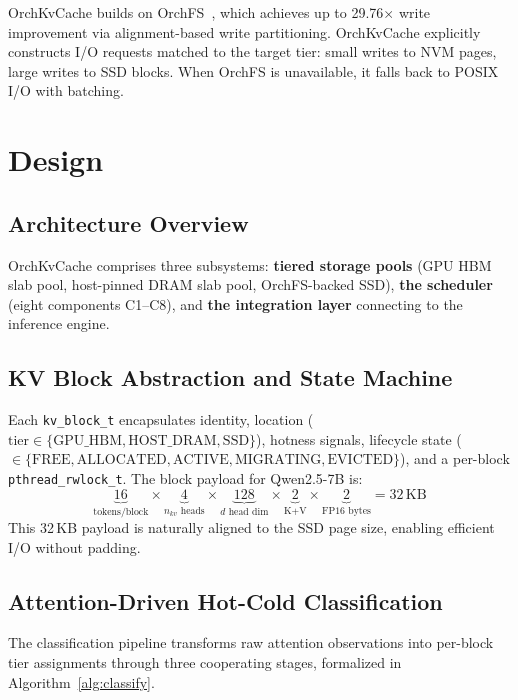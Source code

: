 \documentclass[conference]{IEEEtran}
\begin{document}
OrchKvCache builds on OrchFS~\cite{orchfs}, which achieves up to 29.76$\times$ write improvement via alignment-based write partitioning. OrchKvCache explicitly constructs I/O requests matched to the target tier: small writes to NVM pages, large writes to SSD blocks. When OrchFS is unavailable, it falls back to POSIX I/O with batching.


\section{Design}

\subsection{Architecture Overview}

OrchKvCache comprises three subsystems: \textbf{tiered storage pools} (GPU HBM slab pool, host-pinned DRAM slab pool, OrchFS-backed SSD), \textbf{the scheduler} (eight components C1--C8), and \textbf{the integration layer} connecting to the inference engine.


\subsection{KV Block Abstraction and State Machine}

Each \texttt{kv\_block\_t} encapsulates identity, location ($\text{tier} \in \{\text{GPU\_HBM}, \text{HOST\_DRAM}, \text{SSD}\}$), hotness signals, lifecycle state ($\in \{\text{FREE}, \text{ALLOCATED}, \text{ACTIVE}, \text{MIGRATING}, \text{EVICTED}\}$), and a per-block \texttt{pthread\_rwlock\_t}. The block payload for Qwen2.5-7B is:
\[
\underbrace{16}_{\text{tokens/block}} \times \underbrace{4}_{n_{kv}\text{ heads}} \times \underbrace{128}_{d\text{ head dim}} \times \underbrace{2}_{\text{K+V}} \times \underbrace{2}_{\text{FP16 bytes}} = 32\,\text{KB}
\]
This 32\,KB payload is naturally aligned to the SSD page size, enabling efficient I/O without padding.


\subsection{Attention-Driven Hot-Cold Classification}
\label{sec:classification}

The classification pipeline transforms raw attention observations into per-block tier assignments through three cooperating stages, formalized in Algorithm~\ref{alg:classify}.
\end{document}
